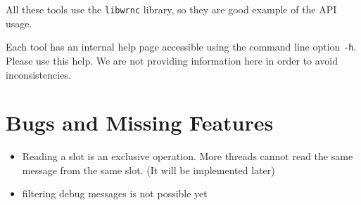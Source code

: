\documentclass[a4paper,10pt]{article}
\begin{document}
All these tools use the \texttt{libwrnc} library, so they are good
example of the API usage.

Each tool has an internal help page accessible using the
command line option \texttt{-h}. Please use this help. We are not
providing information here in order to avoid inconsistencies.

\section{Bugs and Missing Features}%
\begin{itemize}
  \item Reading a slot is an exclusive operation. More threads cannot
    read the same message from the same slot. (It will be implemented
    later)
  \item filtering debug messages is not possible yet
\end{itemize}
\end{document}
